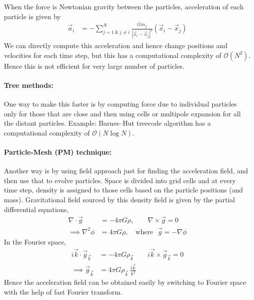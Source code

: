 \documentclass[12pt]{article}
\begin{document}
When the force is Newtonian gravity between the particles, acceleration of each particle is given by
\begin{align}
\vec{a}_i &= - \sum_{j=1 ~\&~ j\neq i}^{N} \frac{G m_j}{|\vec{x}_i-\vec{x}_j|^3} (\vec{x}_i-\vec{x}_j)
\end{align}
We can directly compute this acceleration and hence change positions and velocities for each time step, but this has a computational complexity of $\mathcal{O}(N^2)$. Hence this is not efficient for very large number of particles.
\paragraph{Tree methods:}
One way to make this faster is by computing force due to individual particles only for those that are close and then using cells or multipole expansion for all the distant particles. Example: Barnes–Hut treecode algorithm has a computational complexity of $\mathcal{O}(N \log N)$.

\paragraph{Particle-Mesh (PM) technique:}
Another way is by using field approach just for finding the acceleration field, and then use that to evolve particles. Space is divided into grid cells and at every time step, density is assigned to those cells based on the particle positions (and mass). Gravitational field sourced by this density field is given by the partial differential equations, %
\begin{align}
\nabla \cdot \vec{g} &= - 4 \pi G \rho, \qquad \nabla \times \vec{g} = 0\\ 
\implies \nabla^2 \phi &= 4 \pi G \rho, \quad \text{where}~~~ \vec{g} = -\nabla \phi
\end{align}
In the Fourier space,
\begin{align}
i \vec{k} \cdot \vec{g}_{\vec{k}} &= - 4 \pi G \rho_{\vec{k}} \qquad i \vec{k} \times \vec{g}_{\vec{k}} = 0\\
\implies \vec{g}_{\vec{k}} &= 4 \pi G \rho_{\vec{k}} ~\frac{i \vec{k}}{k^2}
\end{align}
Hence the acceleration field can be obtained easily by switching to Fourier space with the help of fast Fourier transform. 


\end{document}
